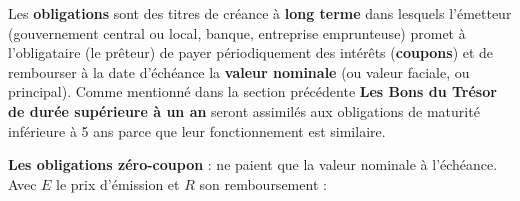 \begin{f}

 Les \textbf{obligations} sont des titres de créance à \textbf{long terme} dans lesquels l'émetteur (gouvernement central ou local, banque, entreprise emprunteuse) promet à l'obligataire (le prêteur) de payer périodiquement des intérêts (\textbf{coupons}) et de rembourser à la date d'échéance la \textbf{valeur nominale} (ou valeur faciale, ou principal). 
Comme mentionné dans la section précédente \textbf{Les Bons du Trésor de durée supérieure à un an} seront assimilés aux obligations de maturité inférieure à 5 ans parce que leur fonctionnement est similaire.


\textbf{Les obligations zéro-coupon} : ne paient que la valeur nominale à l'échéance. Avec $E$ le prix d'émission et $R$ son remboursement :
	
\begin{center}
\end{center}


\end{f}
